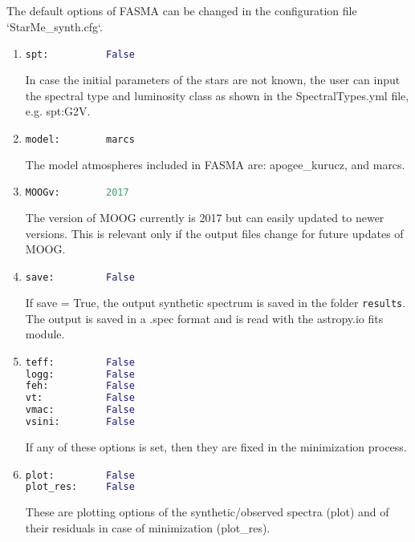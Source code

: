 \documentclass[a4paper,12pt]{article}
\begin{document}
The default options of FASMA can be changed in the configuration file `StarMe\_synth.cfg`.
\begin{enumerate}
 \item
\begin{lstlisting}[language=Python]
spt:          False

\end{lstlisting}
In case the initial parameters of the stars are not known, the user can input the spectral type and luminosity class as shown in the SpectralTypes.yml file, e.g. spt:G2V.

\item
\begin{lstlisting}[language=Python]
model:        marcs
\end{lstlisting}
The model atmospheres included in FASMA are: apogee\_kurucz, and marcs.

\item
\begin{lstlisting}[language=Python]
MOOGv:        2017
\end{lstlisting}

The version of MOOG currently is 2017 but can easily updated to newer versions. This is relevant only if the output files change for future updates of MOOG.

\item
\begin{lstlisting}[language=Python]
save:         False
\end{lstlisting}
If save = True, the output synthetic spectrum is saved in the folder \texttt{results}. The output is saved in a .spec format and is read with the astropy.io fits module.

\item
\begin{lstlisting}[language=Python]
teff:         False
logg:         False
feh:          False
vt:           False
vmac:         False
vsini:        False
\end{lstlisting}
If any of these options is set, then they are fixed in the minimization process. 

\item
\begin{lstlisting}[language=Python]
plot:         False
plot_res:     False
\end{lstlisting}
These are plotting options of the synthetic/observed spectra (plot) and of their residuals in case of minimization (plot\_res).


\end{enumerate}
\end{document}
